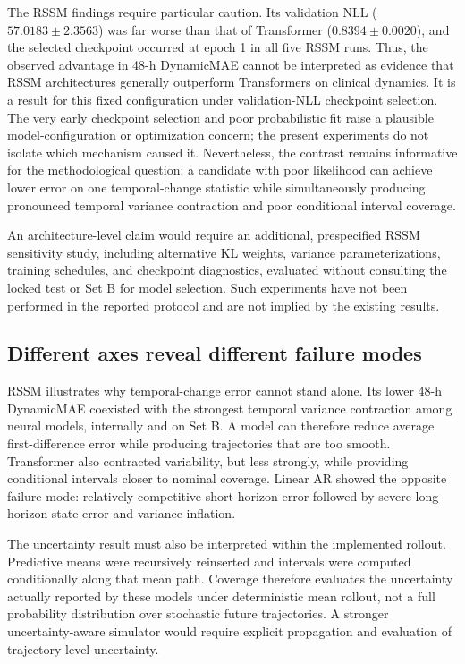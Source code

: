 \documentclass[preprint,12pt]{elsarticle}
\begin{document}
The RSSM findings require particular caution. Its validation NLL ($57.0183\pm2.3563$) was far worse than that of Transformer ($0.8394\pm0.0020$), and the selected checkpoint occurred at epoch 1 in all five RSSM runs. Thus, the observed advantage in 48-h DynamicMAE cannot be interpreted as evidence that RSSM architectures generally outperform Transformers on clinical dynamics. It is a result for this fixed configuration under validation-NLL checkpoint selection. The very early checkpoint selection and poor probabilistic fit raise a plausible model-configuration or optimization concern; the present experiments do not isolate which mechanism caused it. Nevertheless, the contrast remains informative for the methodological question: a candidate with poor likelihood can achieve lower error on one temporal-change statistic while simultaneously producing pronounced temporal variance contraction and poor conditional interval coverage.

An architecture-level claim would require an additional, prespecified RSSM sensitivity study, including alternative KL weights, variance parameterizations, training schedules, and checkpoint diagnostics, evaluated without consulting the locked test or Set B for model selection. Such experiments have not been performed in the reported protocol and are not implied by the existing results.

\subsection{Different axes reveal different failure modes}

RSSM illustrates why temporal-change error cannot stand alone. Its lower 48-h DynamicMAE coexisted with the strongest temporal variance contraction among neural models, internally and on Set B. A model can therefore reduce average first-difference error while producing trajectories that are too smooth. Transformer also contracted variability, but less strongly, while providing conditional intervals closer to nominal coverage. Linear AR showed the opposite failure mode: relatively competitive short-horizon error followed by severe long-horizon state error and variance inflation.

The uncertainty result must also be interpreted within the implemented rollout. Predictive means were recursively reinserted and intervals were computed conditionally along that mean path. Coverage therefore evaluates the uncertainty actually reported by these models under deterministic mean rollout, not a full probability distribution over stochastic future trajectories. A stronger uncertainty-aware simulator would require explicit propagation and evaluation of trajectory-level uncertainty.
\end{document}

